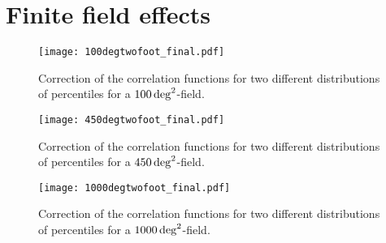 \section{Finite field effects}

\begin{figure}[h]
\centering
\texttt{[image: 100degtwofoot\_final.pdf]}
\caption[Correction of the correlation functions for a $100\,\rm{deg}^2$-field.] {Correction of the correlation functions for two different distributions of percentiles for a $100\,\rm{deg}^2$-field.}
\label{fig:100degsqr}
\end{figure}

\begin{figure}[h]
\centering
\texttt{[image: 450degtwofoot\_final.pdf]}
\caption[Correction of the correlation functions for a $450\,\rm{deg}^2$-field.] {Correction of the correlation functions for two different distributions of percentiles for a $450\,\rm{deg}^2$-field.}
\label{fig:450degsqr}
\end{figure}

\begin{figure}[h]
\centering
\texttt{[image: 1000degtwofoot\_final.pdf]}
\caption[Correction of the correlation functions for a $1000\,\rm{deg}^2$-field.] {Correction of the correlation functions for two different distributions of percentiles for a $1000\,\rm{deg}^2$-field.}
\label{fig:1000degsqr}
\end{figure}

